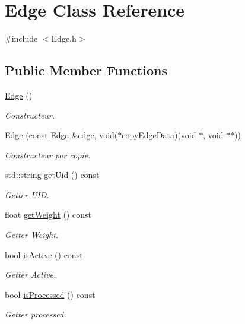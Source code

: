 \hypertarget{class_edge}{}\section{Edge Class Reference}
\label{class_edge}


{\ttfamily \#include $<$Edge.\+h$>$}

\subsection*{Public Member Functions}
\begin{DoxyCompactItemize}
\item 
\mbox{\hyperlink{class_edge_a3106b11d60125009dbf7a738ce540fdf}{Edge}} ()
\begin{DoxyCompactList}\small\item\em Constructeur. \end{DoxyCompactList}\item 
\mbox{\hyperlink{class_edge_a12b460c6c0a255c44d564b033b056b02}{Edge}} (const \mbox{\hyperlink{class_edge}{Edge}} \&edge, void($\ast$copy\+Edge\+Data)(void $\ast$, void $\ast$$\ast$))
\begin{DoxyCompactList}\small\item\em Constructeur par copie. \end{DoxyCompactList}\item 
std\+::string \mbox{\hyperlink{class_edge_abf97244f7446b4192dfa1e87a156920d}{get\+Uid}} () const
\begin{DoxyCompactList}\small\item\em Getter U\+ID. \end{DoxyCompactList}\item 
float \mbox{\hyperlink{class_edge_a873322923fa6340e17edb39b923f7d61}{get\+Weight}} () const
\begin{DoxyCompactList}\small\item\em Getter Weight. \end{DoxyCompactList}\item 
bool \mbox{\hyperlink{class_edge_a29524dddcadb4eae07997fa8fb6fd76f}{is\+Active}} () const
\begin{DoxyCompactList}\small\item\em Getter Active. \end{DoxyCompactList}\item 
bool \mbox{\hyperlink{class_edge_a91b5c22287996d54ae90b1393d11e98c}{is\+Processed}} () const
\begin{DoxyCompactList}\small\item\em Getter processed. \end{DoxyCompactList}\item 
$$
\end{DoxyCompactItemize}
